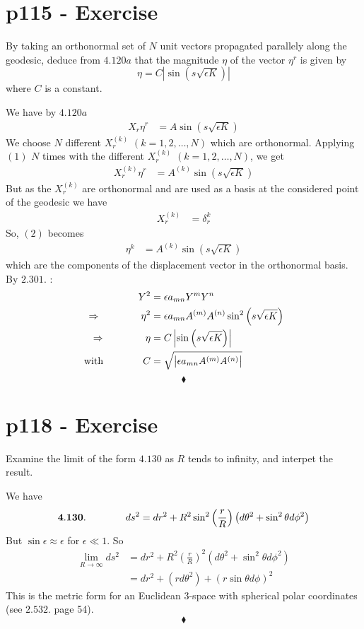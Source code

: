 \section{p115 - Exercise}
\begin{tcolorbox}
By taking an orthonormal set of $N$ unit vectors propagated parallely along the geodesic, deduce from $4.120a$ that the magnitude $\eta$ of the vector $\eta^r$ is given by $$ \eta = C\left|\sin \left(s\sqrt{\epsilon K}\right)\right|$$ where $C$ is a constant.
\end{tcolorbox}
We have by $4.120a$
\begin{align}
X_r \eta^r &= A\sin \left(s\sqrt{\epsilon K}\right)
\end{align}
We choose $N$ different $X^{(k)}_r$ $(k= 1,2,\dots, N)$ which are orthonormal.
Applying $(1)$ $N$ times with the different $X^{(k)}_r$ $(k= 1,2,\dots, N)$, we get
\begin{align}
X^{(k)}_r \eta^r &= A^{(k)}\sin \left(s\sqrt{\epsilon K}\right)
\end{align}
But as the $X^{(k)}_r$ are orthonormal and are used as a basis at the considered point of the geodesic we have 
\begin{align*}
X^{(k)}_r &= \delta^k_r
\end{align*}
So, $(2)$ becomes
\begin{align*}
\eta^k &= A^{(k)}\sin \left(s\sqrt{\epsilon K}\right)
\end{align*}
which are the components of the displacement vector in the orthonormal basis. By $\mathbf{2.301.}$ :
\begin{align*}
Y^2 &= \epsilon a_{mn} Y^m Y^n\\
\Rightarrow \quad\quad\quad\quad \eta^2 &= \epsilon a_{mn} A^{(m)} A^{(n)}\sin^2 \left(s\sqrt{\epsilon K}\right)\\
\Rightarrow \quad\quad\quad\quad \eta &= C\left|\sin \left(s\sqrt{\epsilon K}\right)\right|\\
\text{with}\quad\quad\quad\quad C&= \sqrt{\left|\epsilon a_{mn} A^{(m)} A^{(n)}\right|}
\end{align*}
$$\blacklozenge$$
\newpage

\section{p118 - Exercise}
\begin{tcolorbox}
Examine the limit of the form $\mathbf{4.130}$ as $R$ tends to infinity, and interpet the result.
\end{tcolorbox}
We have $$\mathbf{4.130.}\quad\quad\quad\quad ds^2 = dr^2+R^2\sin^2\left(\frac{r}{R}\right)\left(d\theta^2 + \sin^2\theta d\phi^2\right)$$
But $\sin \epsilon \approx \epsilon$ for $\epsilon  \ll 1$. So
\begin{align}
 \lim_{R\rightarrow \infty} ds^2 &= dr^2+R^2\left(\frac{r}{R}\right)^2\left(d\theta^2 + \sin^2\theta d\phi^2\right)\\
 &= dr^2+\left(r d\theta^2 \right) + \left(r\sin\theta d\phi\right)^2
 \end{align}
 This is the metric form for an Euclidean 3-space with spherical polar coordinates (see $\mathbf{2.532.}$ page 54).
$$\blacklozenge$$
\newpage


